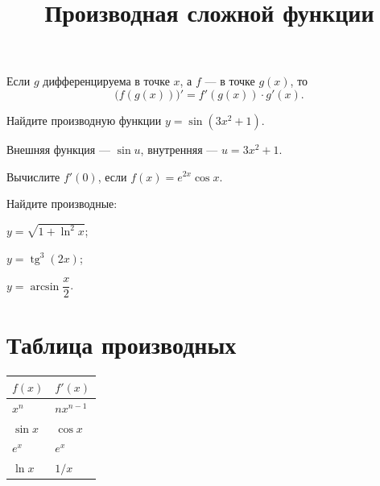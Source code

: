 \documentclass[dz]{petrovsky}
\title{Производная сложной функции}
\begin{document}
\maketitle

\begin{theorem}
Если $g$ дифференцируема в точке $x$, а $f$ — в точке $g(x)$, то
\[ \bigl(f(g(x))\bigr)' = f'(g(x))\cdot g'(x). \]
\end{theorem}

\begin{task}[1 балл]
Найдите производную функции $y = \sin(3x^2+1)$.
\end{task}
\begin{hint}
Внешняя функция — $\sin u$, внутренняя — $u = 3x^2+1$.
\end{hint}

\begin{task}[2 балла]
Вычислите $f'(0)$, если $f(x) = e^{2x}\cos x$.
\end{task}

\begin{task}[3 балла]
Найдите производные:
\begin{parts}
  \item $y = \sqrt{1 + \ln^2 x}$;
  \item $y = \operatorname{tg}^3(2x)$;
  \item $y = \arcsin\dfrac{x}{2}$.
\end{parts}
\end{task}

\section{Таблица производных}
\begin{tabular}{@{}ll@{}}
\toprule
$f(x)$ & $f'(x)$ \\ \midrule
$x^n$ & $n x^{n-1}$ \\
$\sin x$ & $\cos x$ \\
$e^x$ & $e^x$ \\
$\ln x$ & $1/x$ \\ \bottomrule
\end{tabular}
\end{document}
